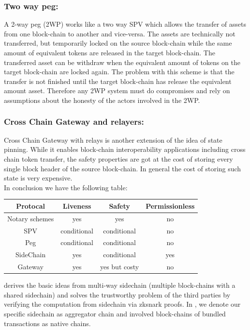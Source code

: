 \documentclass[pageno]{jpaper}
\begin{document}
\subsubsection{Two way peg:}
    A 2-way peg (2WP) works like a two way SPV which allows the transfer of assets from one block-chain to another and vice-versa. The assets are technically not transferred, but temporarily locked on the source block-chain while the same amount of equivalent tokens are released in the target block-chain. The transferred asset can be withdraw when the equivalent amount of tokens on the target block-chain are locked again. The problem with this scheme is that the transfer is not finished until the target block-chain has release the equivalent amount asset. Therefore any 2WP system must do compromises and rely on assumptions about the honesty of the actors involved in the 2WP.
\\
\subsubsection{Cross Chain Gateway and relayers:}
    Cross Chain Gateway with relays is another extension of the idea of state pinning. While it enables block-chain interoperability applications including cross chain token transfer, the safety properties are got at the cost of storing every single block header of the source block-chain\cite{belchior2021survey}. In general the cost of storing such state is very expensive.
\\
\newline
In conclusion we have the following table:
\begin{table}[h]
\small
\centering
\begin{tabular}{ | c | c | c | c | }
\hline
Protocal & Liveness & Safety & Permissionless \\
\hline
Notary schemes & yes & yes & no\\
\hline
SPV & conditional & conditional & no \\
\hline
Peg & conditional & conditional & no \\
\hline
SideChain & yes & conditional & yes \\ 
\hline
Gateway& yes & yes but costy & no \\ 
\hline
\end{tabular}
\end{table}

\dprotocol derives the basic ideas from multi-way sidechain (multiple block-chains with a shared sidechain) and solves the trustworthy problem of the third parties by verifying the computation from sidechain via zksnark proofs. In \dprotocol, we denote our specific sidechain as aggregator chain and involved block-chains of bundled transactions as native chains.
\end{document}
